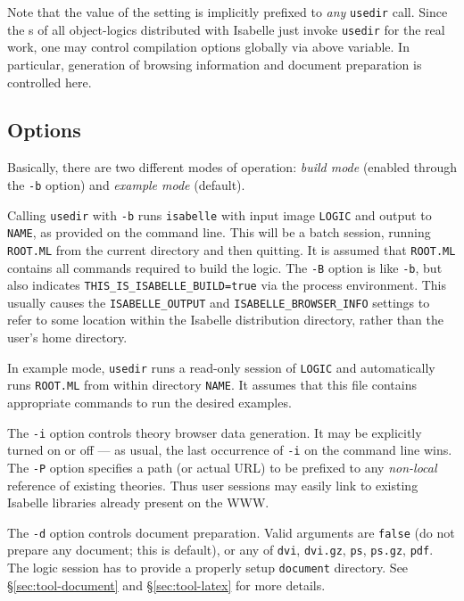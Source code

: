 Note that the value of the  setting is
implicitly prefixed to \emph{any} \texttt{usedir} call. Since the
s of all object-logics distributed with Isabelle just
invoke \texttt{usedir} for the real work, one may control compilation options
globally via above variable. In particular, generation of 
browsing information and document preparation is controlled here.


\subsection*{Options}

Basically, there are two different modes of operation: \emph{build mode}
(enabled through the \texttt{-b} option) and \emph{example mode} (default).

Calling \texttt{usedir} with \texttt{-b} runs \texttt{isabelle} with input
image \texttt{LOGIC} and output to \texttt{NAME}, as provided on the command
line. This will be a batch session, running \texttt{ROOT.ML} from the current
directory and then quitting.  It is assumed that \texttt{ROOT.ML} contains all
{\ML} commands required to build the logic.  The \texttt{-B} option is like
\texttt{-b}, but also indicates \texttt{THIS_IS_ISABELLE_BUILD=true} via the
process environment.  This usually causes the \texttt{ISABELLE\_OUTPUT} and
\texttt{ISABELLE_BROWSER_INFO} settings to refer to some location within the
Isabelle distribution directory, rather than the user's home directory.

In example mode, \texttt{usedir} runs a read-only session of \texttt{LOGIC}
and automatically runs \texttt{ROOT.ML} from within directory \texttt{NAME}.
It assumes that this file contains appropriate {\ML} commands to run the
desired examples.

\medskip The \texttt{-i} option controls theory browser data generation. It
may be explicitly turned on or off --- as usual, the last occurrence of
\texttt{-i} on the command line wins.  The \texttt{-P} option specifies a path
(or actual URL) to be prefixed to any \emph{non-local} reference of existing
theories.  Thus user sessions may easily link to existing Isabelle libraries
already present on the WWW.

\medskip The \texttt{-d} option controls document preparation.  Valid
arguments are \texttt{false} (do not prepare any document; this is default),
or any of \texttt{dvi}, \texttt{dvi.gz}, \texttt{ps}, \texttt{ps.gz},
\texttt{pdf}.  The logic session has to provide a properly setup
\texttt{document} directory.  See \S\ref{sec:tool-document} and
\S\ref{sec:tool-latex} for more details.


